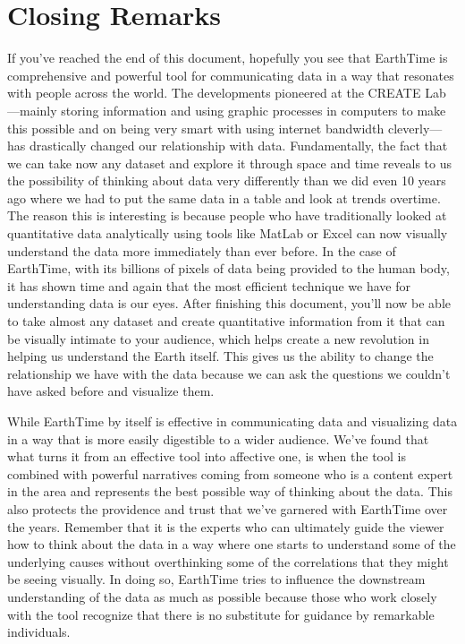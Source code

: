 \documentclass[
  12pt,
]{krantz}
\begin{document}
\hypertarget{closing-remarks}{%
\section{Closing Remarks}\label{closing-remarks}}

If you've reached the end of this document, hopefully you see that EarthTime is comprehensive and powerful tool for communicating data in a way that resonates with people across the world. The developments pioneered at the CREATE Lab---mainly storing information and using graphic processes in computers to make this possible and on being very smart with using internet bandwidth cleverly---has drastically changed our relationship with data. Fundamentally, the fact that we can take now any dataset and explore it through space and time reveals to us the possibility of thinking about data very differently than we did even 10 years ago where we had to put the same data in a table and look at trends overtime. The reason this is interesting is because people who have traditionally looked at quantitative data analytically using tools like MatLab or Excel can now visually understand the data more immediately than ever before. In the case of EarthTime, with its billions of pixels of data being provided to the human body, it has shown time and again that the most efficient technique we have for understanding data is our eyes. After finishing this document, you'll now be able to take almost any dataset and create quantitative information from it that can be visually intimate to your audience, which helps create a new revolution in helping us understand the Earth itself. This gives us the ability to change the relationship we have with the data because we can ask the questions we couldn't have asked before and visualize them.

While EarthTime by itself is effective in communicating data and visualizing data in a way that is more easily digestible to a wider audience. We've found that what turns it from an effective tool into affective one, is when the tool is combined with powerful narratives coming from someone who is a content expert in the area and represents the best possible way of thinking about the data. This also protects the providence and trust that we've garnered with EarthTime over the years. Remember that it is the experts who can ultimately guide the viewer how to think about the data in a way where one starts to understand some of the underlying causes without overthinking some of the correlations that they might be seeing visually. In doing so, EarthTime tries to influence the downstream understanding of the data as much as possible because those who work closely with the tool recognize that there is no substitute for guidance by remarkable individuals.
\end{document}
